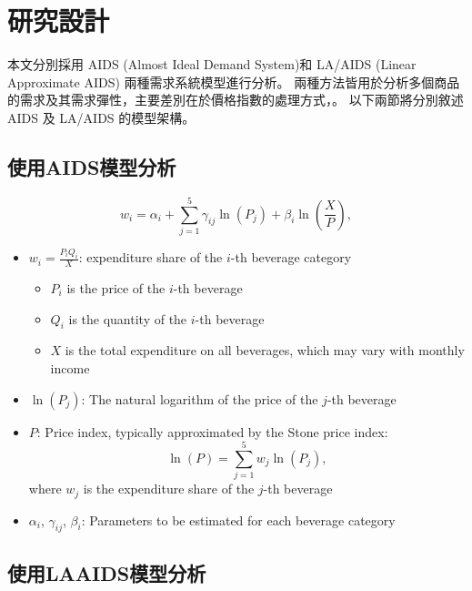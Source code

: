 \section{研究設計}

本文分別採用 AIDS (Almost Ideal Demand System)和 LA/AIDS (Linear Approximate AIDS) 兩種需求系統模型進行分析。
兩種方法皆用於分析多個商品的需求及其需求彈性，主要差別在於價格指數的處理方式，。
以下兩節將分別敘述 AIDS 及 LA/AIDS 的模型架構。

\subsection{使用AIDS模型分析}

\[
	w_i = \alpha_i + \sum_{j=1}^{5} \gamma_{ij} \ln(P_j) + \beta_i \ln\left(\frac{X}{P}\right),
\]
\begin{itemize}
	\item $w_i = \frac{P_i Q_i}{X}$: expenditure share of the $i$-th beverage category
	\begin{itemize}
		\item $P_i$ is the price of the $i$-th beverage
		\item $Q_i$ is the quantity of the $i$-th beverage
		\item $X$ is the total expenditure on all beverages, which may vary with monthly income
	\end{itemize}
	\item $\ln(P_j)$: The natural logarithm of the price of the $j$-th beverage
	\item $P$: Price index, typically approximated by the Stone price index:
	\begin{equation*}
	\ln(P) = \sum_{j=1}^{5} w_j \ln(P_j),
	\end{equation*}
	where $w_j$ is the expenditure share of the $j$-th beverage
	\item $\alpha_i$, $\gamma_{ij}$, $\beta_i$: Parameters to be estimated for each beverage category
\end{itemize}

\subsection{使用LAAIDS模型分析}